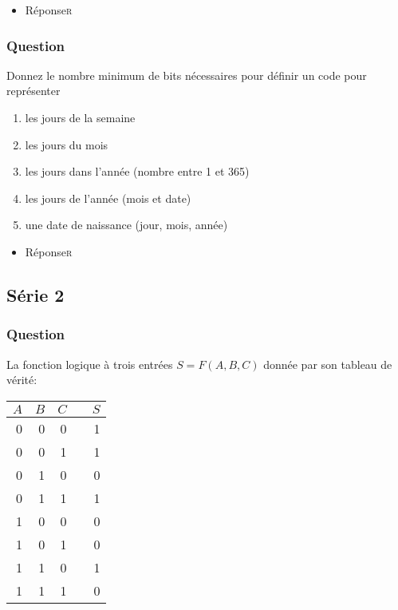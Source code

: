 \documentclass[11pt]{article}
\begin{document}
\begin{itemize}
\item Réponse\hfill{}\textsc{r}
\label{sec:org6fa91c8}
\end{itemize}

\subsubsection*{Question}
\label{sec:org4c7c471}
Donnez le nombre minimum de bits nécessaires pour définir un code pour représenter

\begin{enumerate}
\item les jours de la semaine

\item les jours du mois

\item les jours dans l'année (nombre entre 1 et 365)

\item les jours de l'année (mois et date)

\item une date de naissance (jour, mois, année)
\end{enumerate}

\begin{itemize}
\item Réponse\hfill{}\textsc{r}
\label{sec:orgc79e27b}
\end{itemize}

\subsection*{Série 2}
\label{sec:org9fd6d2b}
\subsubsection*{Question}
\label{sec:org36ee329}
La fonction logique à trois entrées \(S = F(A,B,C)\) donnée par son 
   tableau de vérité:
\begin{center}
\begin{tabular}{rrrlr}
\(A\) & \(B\) & \(C\) &  & \(S\)\\
\hline
0 & 0 & 0 &  & 1\\
0 & 0 & 1 &  & 1\\
0 & 1 & 0 &  & 0\\
0 & 1 & 1 &  & 1\\
1 & 0 & 0 &  & 0\\
1 & 0 & 1 &  & 0\\
1 & 1 & 0 &  & 1\\
1 & 1 & 1 &  & 0\\
\end{tabular}
\end{center}
\end{document}
